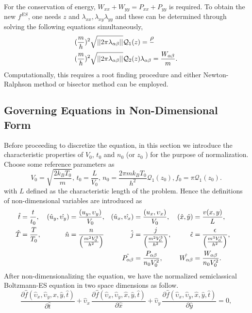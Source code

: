 \documentclass{rsproca}%
\begin{document}
For the conservation of energy, $W_{xx} +W_{yy} = P_{xx} + P_{yy}$ is required.
To obtain the new $f^{ES}$, one needs $z$ and $\lambda_{xx}, \lambda_{xy}\lambda_{yy}$ and these can be determined through solving the following equations simultaneously,
\begin{align}
&({m \over h})^2 \sqrt{||2 \pi \lambda_{\alpha \beta} ||}\mathcal{Q}_{1}(z) = {\rho \over } \nonumber\\
&({m \over h})^2 \sqrt{||2 \pi \lambda_{\alpha \beta} ||}\mathcal{Q}_{2}(z) \lambda_{\alpha \beta}= {W_{\alpha \beta} \over m}.
\end{align}
Computationally, this requires a root finding procedure and either Newton-Ralphson method or bisector method can be employed.

\subsection{Governing Equations in Non-Dimensional Form}
\label{subsec:3_2}
Before proceeding to discretize the equation, in this section we introduce the characteristic properties of $V_0$, $t_0$ and $n_0$ (or $z_0$ ) for the purpose of normalization.  Choose some reference parameters as
\begin{equation}
V_0 = \sqrt{\frac{2k_B T_0}{m}}, \, t_0 = \frac{L}{V_0},\, n_{0} = \frac{2 \pi m k_B T_0}{h^2} \mathcal{Q}_1 (z_0), f_0=\pi \mathcal{Q}_1(z_0).
\end{equation}
with $L$ defined as the characteristic length of the problem. Hence the definitions of non-dimensional variables are introduced as
\begin{align}
\hat{t} &=\frac{t}{t_0},& (\hat{u}_y,\hat{\upsilon_y})&={(u_y,\upsilon_y)\over V_0},& 
(\hat{u}_x,\hat{\upsilon_x})&=\frac{(u_x,\upsilon_x)}{V_0},& (\hat{x},\hat{y})&=\frac{v(x, y)}{L},& \nonumber \\
\hat{T}&=\frac{T}{T_0},& \hat{n}&={n \over \left(\frac{m^2V_0^2}{h^2}\right)}& 
\hat{j}&={j \over \left(\frac{m^2V_{0}^3}{h^2}\right) },& \hat{\epsilon}&={\epsilon \over \left(\frac{m^3 V_{0}^4}{h^2}\right)},& \nonumber \\
& & & &\hat{P_{\alpha \beta}} &= { P_{\alpha \beta} \over n_{0} V_{0}^2 },& \hat{W_{\alpha \beta}} &= { W_{\alpha \beta} \over n_{0} V_0^2}.&
\end{align}
After non-dimensionalizing the equation, we have the normalized semiclassical Boltzmann-ES equation in two space dimensions as follow.
\begin{equation}
\frac{\partial\hat{f}(\hat{\upsilon}_x,\hat{\upsilon}_y,\hat{x},\hat{y},\hat{t})}{\partial\hat{t}} + \hat{\upsilon}_x\,\frac{\partial\hat{f}(\hat{\upsilon}_x,\hat{\upsilon}_y,\hat{x},\hat{y},\hat{t})}{\partial\hat{x}} + \hat{\upsilon}_y\,\frac{\partial\hat{f}(\hat{\upsilon}_x,\hat{\upsilon}_y,\hat{x},\hat{y},\hat{t})}{\partial\hat{y}} = 0, \label{normalizedes}
\end{equation}
\end{document}
